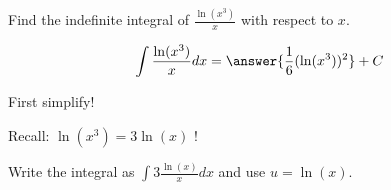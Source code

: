 \documentclass{ximera}
\author{Gregory Hartman \and Matthew Carr}
\begin{document}
\begin{exercise}

Find the indefinite integral of $\frac{\ln(x^3)}{x}$ with respect to $x$.

\[
\int \frac{\ln(x^3)}{x} dx=\answer{\frac{1}{6}(\ln(x^3))^2}+C
\]
\begin{hint}
First simplify!
\end{hint}
\begin{hint}
Recall: $\ln(x^3)=3\ln(x)$ !
\end{hint}
\begin{hint}
Write the integral as $\int 3\frac{\ln(x)}{x} dx$ and use $u=\ln(x)$.
\end{hint}

\end{exercise}
\end{document}
